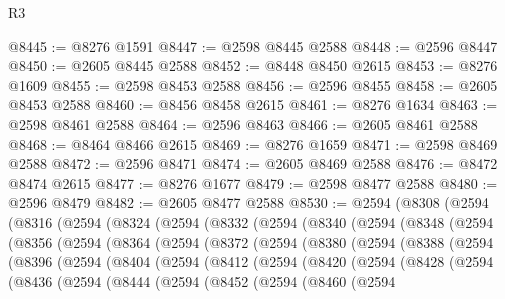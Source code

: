 \begin{lexlean}{R3}
\begin{coremodule}
@8445 := @8276 @1591
@8447 := @2598 @8445 @2588
@8448 := @2596 @8447
@8450 := @2605 @8445 @2588
@8452 := @8448 @8450 @2615
@8453 := @8276 @1609
@8455 := @2598 @8453 @2588
@8456 := @2596 @8455
@8458 := @2605 @8453 @2588
@8460 := @8456 @8458 @2615
@8461 := @8276 @1634
@8463 := @2598 @8461 @2588
@8464 := @2596 @8463
@8466 := @2605 @8461 @2588
@8468 := @8464 @8466 @2615
@8469 := @8276 @1659
@8471 := @2598 @8469 @2588
@8472 := @2596 @8471
@8474 := @2605 @8469 @2588
@8476 := @8472 @8474 @2615
@8477 := @8276 @1677
@8479 := @2598 @8477 @2588
@8480 := @2596 @8479
@8482 := @2605 @8477 @2588
@8530 := @2594
    (@8308
      (@2594
        (@8316
          (@2594
            (@8324
              (@2594
                (@8332
                  (@2594
                    (@8340
                      (@2594
                        (@8348
                          (@2594
                            (@8356
                              (@2594
                                (@8364
                                  (@2594
                                    (@8372
                                      (@2594
                                        (@8380
                                          (@2594
                                            (@8388
                                              (@2594
                                                (@8396
                                                  (@2594
                                                    (@8404
                                                      (@2594
                                                        (@8412
                                                          (@2594
                                                            (@8420
                                                              (@2594
                                                                (@8428
                                                                  (@2594
                                                                    (@8436
                                                                      (@2594
                                                                        (@8444
                                                                          (@2594
                                                                            (@8452
                                                                              (@2594
                                                                                (@8460
                                                                                  (@2594

\end{coremodule}
\end{lexlean}
